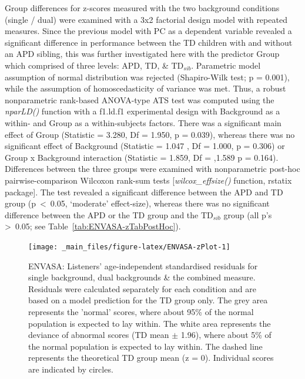 \documentclass[a4paper, twoside]{templates/ociamthesis}
\begin{document}
Group differences for z-scores measured with the two background conditions (single / dual) were examined with a 3x2 factorial design model with repeated measures. Since the previous model with PC as a dependent variable revealed a significant difference in performance between the TD children with and without an APD sibling, this was further investigated here with the predictor Group which comprised of three levels: APD, TD, \& TD\(_{sib}\). Parametric model assumption of normal distribution was rejected (Shapiro-Wilk test; p = 0.001), while the assumption of homoscedasticity of variance was met. Thus, a robust nonparametric rank-based ANOVA-type ATS test was computed using the \emph{nparLD()} function with a f1.ld.f1 experimental design with Background as a within- and Group as a within-subjects factors. There was a significant main effect of Group (Statistic = 3.280, Df = 1.950, p = 0.039), whereas there was no significant effect of Background (Statistic = 1.047 , Df = 1.000, p = 0.306) or Group x Background interaction (Statistic = 1.859, Df = ,1.589 p = 0.164). Differences between the three groups were examined with nonparametric post-hoc pairwise-comparison Wilcoxon rank-sum tests {[}\emph{wilcox\_effsize()} function, rstatix package{]}. The test revealed a significant difference between the APD and TD group (p~\textless~0.05, `moderate' effect-size), whereas there was no significant difference between the APD or the TD group and the TD\(_{sib}\) group (all p's \textgreater~0.05; see Table~\ref{tab:ENVASA-zTabPostHoc}).

\begin{figure}

{\centering \texttt{[image: \_main\_files/figure-latex/ENVASA-zPlot-1]} 

}

\caption{ENVASA: Listeners' age-independent standardised residuals for single background, dual backgrounds \& the combined measure. Residuals were calculated separately for each condition and are based on a model prediction for the TD group only. The grey area represents the 'normal' scores, where about 95\% of the normal population is expected to lay within. The white area represents the deviance of abnormal scores (TD mean $\pm$ 1.96), where about 5\% of the normal population is expected to lay within. The dashed line represents the theoretical TD group mean (z = 0). Individual scores are indicated by circles.}\label{fig:ENVASA-zPlot}
\end{figure}
\end{document}
